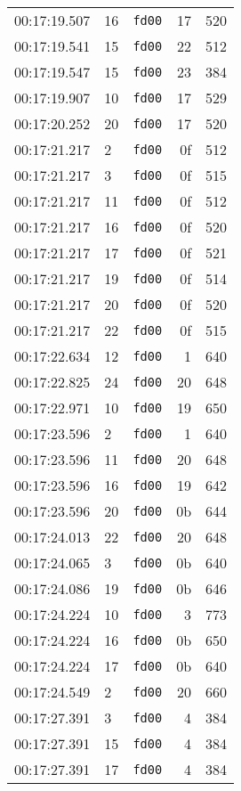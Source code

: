 \documentclass{article}
\begin{document}
\begin{longtable}{lllrr}
00:17:19.507 & 16 & \texttt{fd00} & 17 & 520 \\
00:17:19.541 & 15 & \texttt{fd00} & 22 & 512 \\
00:17:19.547 & 15 & \texttt{fd00} & 23 & 384 \\
00:17:19.907 & 10 & \texttt{fd00} & 17 & 529 \\
00:17:20.252 & 20 & \texttt{fd00} & 17 & 520 \\
00:17:21.217 & 2 & \texttt{fd00} & 0f & 512 \\
00:17:21.217 & 3 & \texttt{fd00} & 0f & 515 \\
00:17:21.217 & 11 & \texttt{fd00} & 0f & 512 \\
00:17:21.217 & 16 & \texttt{fd00} & 0f & 520 \\
00:17:21.217 & 17 & \texttt{fd00} & 0f & 521 \\
00:17:21.217 & 19 & \texttt{fd00} & 0f & 514 \\
00:17:21.217 & 20 & \texttt{fd00} & 0f & 520 \\
00:17:21.217 & 22 & \texttt{fd00} & 0f & 515 \\
00:17:22.634 & 12 & \texttt{fd00} & 1 & 640 \\
00:17:22.825 & 24 & \texttt{fd00} & 20 & 648 \\
00:17:22.971 & 10 & \texttt{fd00} & 19 & 650 \\
00:17:23.596 & 2 & \texttt{fd00} & 1 & 640 \\
00:17:23.596 & 11 & \texttt{fd00} & 20 & 648 \\
00:17:23.596 & 16 & \texttt{fd00} & 19 & 642 \\
00:17:23.596 & 20 & \texttt{fd00} & 0b & 644 \\
00:17:24.013 & 22 & \texttt{fd00} & 20 & 648 \\
00:17:24.065 & 3 & \texttt{fd00} & 0b & 640 \\
00:17:24.086 & 19 & \texttt{fd00} & 0b & 646 \\
00:17:24.224 & 10 & \texttt{fd00} & 3 & 773 \\
00:17:24.224 & 16 & \texttt{fd00} & 0b & 650 \\
00:17:24.224 & 17 & \texttt{fd00} & 0b & 640 \\
00:17:24.549 & 2 & \texttt{fd00} & 20 & 660 \\
00:17:27.391 & 3 & \texttt{fd00} & 4 & 384 \\
00:17:27.391 & 15 & \texttt{fd00} & 4 & 384 \\
00:17:27.391 & 17 & \texttt{fd00} & 4 & 384 \\

\end{longtable}
\end{document}
